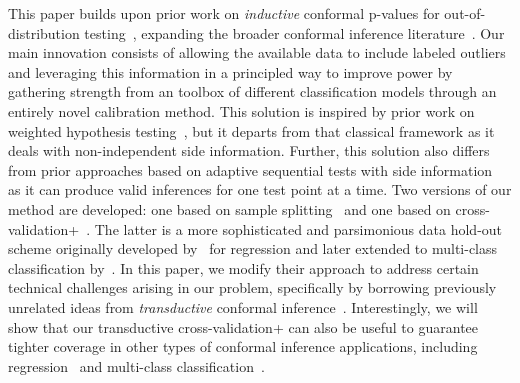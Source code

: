 \documentclass[11pt]{article}
\begin{document}
This paper builds upon prior work on {\em inductive} conformal p-values for out-of-distribution
testing~\cite{laxhammar2015inductive,smith2015conformal,ishimtsev2017conformal,guan2019prediction,cai2020real,haroush2021statistical,bates2021testing,haroush2021statistical}, expanding the broader conformal inference literature~\cite{vovk1999machine, vovk2005algorithmic,angelopoulos2021gentle}.
Our main innovation consists of allowing the available data to include labeled outliers and leveraging this information in a principled way to improve power by gathering strength from an toolbox of different classification models through an entirely novel calibration method. 
This solution is inspired by prior work on weighted hypothesis testing~\cite{genovese2006false,hu2010false,efron2012large,ignatiadis2016data,li2019multiple,ignatiadis2021covariate,Caietal20,liang2022locally,basu2018weighted,benjamini1997weights,roquain2008optimal}, but it departs from that classical framework as it deals with non-independent side information. Further, this solution also differs from prior approaches based on adaptive sequential tests with side information~\cite{li2017accumulation,lei2018adapt} as it can produce valid inferences for one test point at a time.
Two versions of our method are developed: one based on sample splitting~\cite{lei2018distribution} and one based on cross-validation+~\cite{barber2019predictive}. The latter is a more sophisticated and parsimonious data hold-out scheme originally developed by~\cite{barber2019predictive} for regression and later extended to multi-class classification by~\cite{romano2020classification}. In this paper, we modify their approach to address certain technical challenges arising in our problem, specifically by borrowing previously unrelated ideas from {\em transductive} conformal inference~\cite{vovk2013transductive}.
Interestingly, we will show that our transductive cross-validation+ can also be useful to guarantee tighter coverage in other types of conformal inference applications, including regression~\cite{lei2014distribution,lei2018distribution,chernozhukov2019distributional, kivaranovic2019adaptive, kuchibhotla2019nested,izbicki2019flexible,romano2019conformalized,sesia2021conformal} and multi-class classification~\cite{vovk2003mondrian,hechtlinger2018cautious,sadinle2019least,cauchois2020knowing,romano2020classification,angelopoulos2020uncertainty}.
\end{document}
